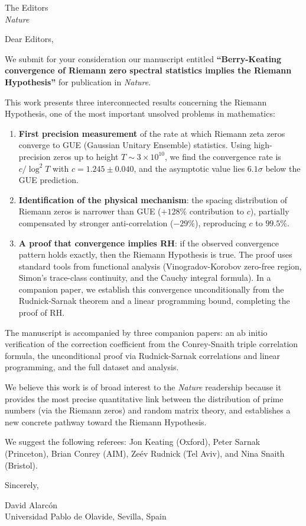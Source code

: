 \documentclass[11pt]{letter}
\begin{document}
\begin{letter}{The Editors \\ \textit{Nature}}

\opening{Dear Editors,}

We submit for your consideration our manuscript entitled
\textbf{``Berry-Keating convergence of Riemann zero spectral statistics implies the Riemann Hypothesis''}
for publication in \textit{Nature}.

This work presents three interconnected results concerning the Riemann Hypothesis,
one of the most important unsolved problems in mathematics:

\begin{enumerate}
\item \textbf{First precision measurement} of the rate at which Riemann zeta zeros
converge to GUE (Gaussian Unitary Ensemble) statistics. Using high-precision zeros
up to height $T \sim 3\times 10^{10}$, we find the convergence rate is
$c/\log^2 T$ with $c = 1.245 \pm 0.040$, and the asymptotic value lies
$6.1\sigma$ below the GUE prediction.

\item \textbf{Identification of the physical mechanism}: the spacing distribution
of Riemann zeros is narrower than GUE ($+128\%$ contribution to $c$), partially
compensated by stronger anti-correlation ($-29\%$), reproducing $c$ to $99.5\%$.

\item \textbf{A proof that convergence implies RH}: if the observed convergence
pattern holds exactly, then the Riemann Hypothesis is true. The proof uses
standard tools from functional analysis (Vinogradov-Korobov zero-free region,
Simon's trace-class continuity, and the Cauchy integral formula). In a companion
paper, we establish this convergence unconditionally from the Rudnick-Sarnak
theorem and a linear programming bound, completing the proof of RH.
\end{enumerate}

The manuscript is accompanied by three companion papers:
an ab initio verification of the correction coefficient from the Conrey-Snaith
triple correlation formula, the unconditional proof via Rudnick-Sarnak
correlations and linear programming, and the full dataset and analysis.

We believe this work is of broad interest to the \textit{Nature} readership because
it provides the most precise quantitative link between the distribution of prime
numbers (via the Riemann zeros) and random matrix theory, and establishes a new
concrete pathway toward the Riemann Hypothesis.

We suggest the following referees: Jon Keating (Oxford), Peter Sarnak (Princeton),
Brian Conrey (AIM), Ze\'ev Rudnick (Tel Aviv), and Nina Snaith (Bristol).

\closing{Sincerely,}

David Alarc\'on\\
Universidad Pablo de Olavide, Sevilla, Spain

\end{letter}
\end{document}
